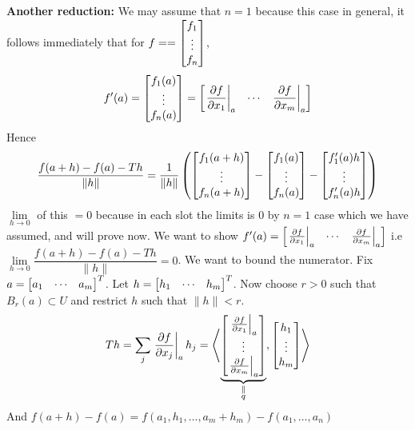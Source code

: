 \begin{myproof}
	\textbf{Another reduction: }We may assume that $n=1$ because this case in general, it follows immediately  that for $f==\left[ \begin{matrix}
				f_1 \\ \vdots\\ f_n
			\end{matrix} \right]$, $$f'(a)=\left[ \begin{matrix}
				f_1(a) \\ \vdots\\ f_n(a)
			\end{matrix} \right]=\left[ \begin{matrix}
				\left.\dfrac{\partial f}{\partial x_1}\right|_a & \cdots & \left.\dfrac{\partial f}{\partial x_m}\right|_a
			\end{matrix} \right]$$Hence $$\dfrac{f(a+h)-f(a)-Th}{\|h\|}=\frac1{\|h\|}\left( \left[ \begin{matrix}
				f_1(a+h) \\ \vdots\\ f_n(a+h)
			\end{matrix} \right]-\left[ \begin{matrix}
				f_1(a) \\ \vdots\\ f_n(a)
			\end{matrix} \right]-\left[ \begin{matrix}
				f_1'(a)h \\ \vdots\\ f_n'(a)h
			\end{matrix} \right] \right)$$$\lim\limits_{h\to 0}$ of this $= 0$ because in each slot the limits is 0 by $n=1$ case which we have assumed, and will prove now.
	\vspace*{2mm}
	We want to show $f'(a)=\left[\begin{matrix}
				\left.\frac{\partial f}{\partial x_1}\right|_a & \cdots & \left.\frac{\partial f}{\partial x_m}\right|_a
			\end{matrix} \right]$ i.e $\lim\limits_{h\to 0}\dfrac{f(a+h)-f(a)-Th}{\|h\|}=0$. We want to bound the numerator. Fix $a=\left[ \begin{matrix}
				a_1 & \cdots & a_m
			\end{matrix} \right]^T$. Let $h=\left[ \begin{matrix}
				h_1 & \cdots & h_m
			\end{matrix} \right]^T$. Now choose $r>0$ such that $B_r(a)\subset U$ and restrict $h$ such that $\|h\|<r$. \[ Th=\sum_j\left.\dfrac{\partial f}{\partial x_j}\right|_ah_j = \left\langle \underbrace{\left[\begin{matrix}
					\left.\frac{\partial f}{\partial x_1}\right|_a \\ \vdots \\ \left.\frac{\partial f}{\partial x_m}\right|_a
				\end{matrix} \right]}_{\substack{\parallel \\ q}}, \left[ \begin{matrix}
				h_1 \\ \vdots \\ h_m
			\end{matrix} \right] \right\rangle \]And $f(a+h)-f(a)=f(a_1,h_1,\dots, a_m+h_m)-f(a_1,\dots, a_n)$


\end{myproof}
